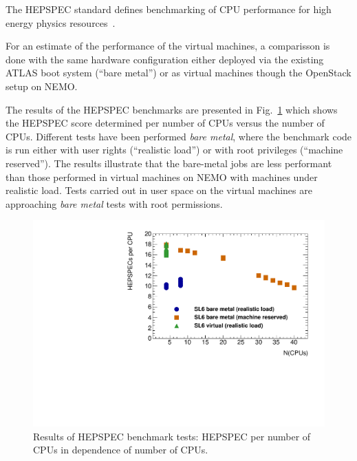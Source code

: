 The HEPSPEC standard defines benchmarking of CPU
performance for high energy physics resources~\cite{Hepspec}.




For an estimate of the performance of the virtual machines,
a comparisson is done with the same hardware configuration either
deployed via the existing ATLAS boot system (``bare metal'') or as virtual machines though the
OpenStack setup on NEMO.

The results of the HEPSPEC benchmarks are presented in
Fig.~\ref{fig:HEPSPECpCPUvsCPU-atlas} which shows the HEPSPEC score
determined per number of CPUs versus the number of CPUs.
Different tests have been performed \textit{bare metal}, where the
benchmark code is run either with user rights (``realistic load'') or
with root privileges (``machine reserved'').
The results illustrate that the bare-metal jobs are less performant
than those performed in virtual machines on NEMO with machines under
realistic load. Tests carried out
in user space on the virtual machines are approaching \textit{bare metal} tests with
root permissions.


\begin{figure}[htbp]
  \includegraphics[width=\columnwidth]{figures/HEPSPECpCPUvsCPU.pdf}
\caption{Results of HEPSPEC benchmark tests: HEPSPEC per number of
  CPUs in dependence of number of CPUs.}
\label{fig:HEPSPECpCPUvsCPU-atlas}
\end{figure}

